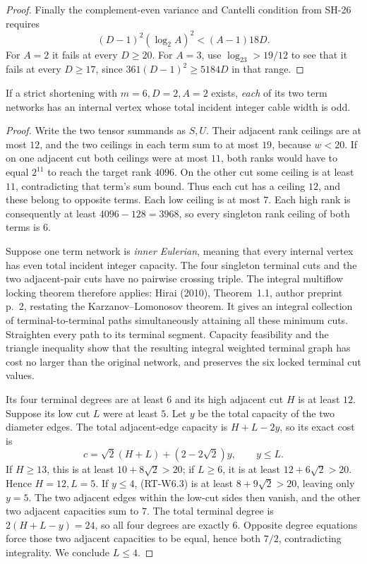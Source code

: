 \begin{proof}
Finally the complement-even variance and Cantelli
condition from SH-26 requires
\[
 (D-1)^2(\log_2A)^2<(A-1)18D.
\]
For $A=2$ it fails at every $D\ge20$.
For $A=3$, use $\log_23>19/12$ to see that it fails
at every $D\ge17$, since
$361(D-1)^2\ge5184D$ in that range.
\end{proof}

\begin{proposition}
\label{rt:width-six-euler}
If a strict shortening with $m=6,D=2,A=2$ exists,
\emph{each} of its two term networks has an internal vertex
whose total incident integer cable width is odd.
\end{proposition}
\begin{proof}
Write the two tensor summands as $S,U$. Their adjacent
rank ceilings are at most $12$, and the two ceilings
in each term sum to at most $19$, because $w<20$.
If on one adjacent cut both ceilings were at most $11$,
both ranks would have to equal $2^{11}$ to reach the
target rank $4096$. On the other cut some ceiling is
at least $11$, contradicting that term's sum bound.
Thus each cut has a ceiling $12$, and these belong to
opposite terms. Each low ceiling is at most $7$.
Each high rank is consequently at least $4096-128=3968$,
so every singleton rank ceiling of both terms is $6$.

Suppose one term network is \emph{inner Eulerian},
meaning that every internal vertex has even total
incident integer capacity. The four singleton terminal
cuts and the two adjacent-pair cuts have no pairwise
crossing triple. The integral multiflow locking theorem
therefore applies: Hirai (2010), Theorem~1.1, author
preprint p.~2, restating the Karzanov--Lomonosov theorem.
It gives an integral collection of terminal-to-terminal
paths simultaneously attaining all these minimum cuts.
Straighten every path to its terminal segment. Capacity
feasibility and the triangle inequality show that the
resulting integral weighted terminal graph has cost no
larger than the original network, and preserves the six
locked terminal cut values.

Its four terminal degrees are at least $6$ and its high
adjacent cut $H$ is at least $12$. Suppose its low cut
$L$ were at least $5$. Let $y$ be the total capacity of
the two diameter edges. The total adjacent-edge capacity
is $H+L-2y$, so its exact cost is
\[
 c=\sqrt2(H+L)+(2-2\sqrt2)y,
 \qquad y\le L.
                                                        \tag{RT-W6.3}
\]
If $H\ge13$, this is at least $10+8\sqrt2>20$;
if $L\ge6$, it is at least $12+6\sqrt2>20$.
Hence $H=12,L=5$. If $y\le4$, (RT-W6.3) is at least
$8+9\sqrt2>20$, leaving only $y=5$. The two adjacent
edges within the low-cut sides then vanish, and the
other two adjacent capacities sum to $7$. The total
terminal degree is $2(H+L-y)=24$, so all four degrees
are exactly $6$. Opposite degree equations force those
two adjacent capacities to be equal, hence both $7/2$,
contradicting integrality. We conclude $L\le4$.


\end{proof}
